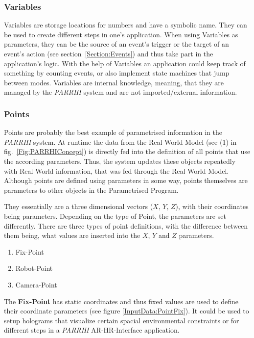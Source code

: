 \subsubsection{Variables}\label{Section:Variables}
Variables are storage locations for numbers and have a symbolic name. They can be used to create different steps in one's application. When using Variables as parameters, they can be the source of an event's trigger or the target of an event's action (see section~\ref{Section:Events}) and thus take part in the application's logic. With the help of Variables an application could keep track of something by counting events, or also implement state machines that jump between modes. Variables are internal knowledge, meaning, that they are managed by the \textit{PARRHI} system and are not imported/external information.

\subsubsection{Points}\label{Section:Points}
Points are probably the best example of parametrised information in the \textit{PARRHI} system. At runtime the data from the Real World Model (see (1) in fig.~\ref{Fig:PARRHIConcept}) is directly fed into the definition of all points that use the according parameters. Thus, the system updates these objects repeatedly with Real World information, that was fed through the Real World Model. Although points are defined using parameters in some way, points themselves are parameters to other objects in the Parametrised Program.
 
They essentially are a three dimensional vectors ($X$, $Y$, $Z$), with their coordinates being parameters. Depending on the type of Point, the parameters are set differently. There are three types of point definitions, with the difference between them being, what values are inserted into the $X$, $Y$ and $Z$ parameters.
\begin{enumerate}
	\setlength\itemsep{-1em}
	\item Fix-Point
	\item Robot-Point
	\item Camera-Point
\end{enumerate}

The \textbf{Fix-Point} has static coordinates and thus fixed values are used to define their coordinate parameters (see figure \ref{InputData:PointFix}). It could be used to setup holograms that visualize certain spacial environmental constraints or for different steps in a \textit{PARRHI} AR-HR-Interface application.

